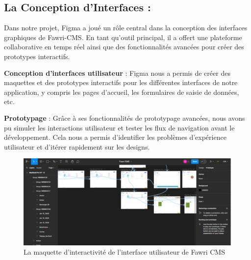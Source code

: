 \subsection{La Conception d'Interfaces :}

\hspace{\parindent}Dans notre projet, Figma a joué un rôle central dans la conception des interfaces graphiques de Fawri-CMS. En tant qu'outil principal, il a offert une plateforme collaborative en temps réel ainsi que des fonctionnalités avancées pour créer des prototypes interactifs.

\textbf{Conception d'interfaces utilisateur} : Figma nous a permis de créer des maquettes et des prototypes interactifs pour les différentes interfaces de notre application, y compris les pages d'accueil, les formulaires de saisie de données, etc.

\textbf{Prototypage} : Grâce à ses fonctionnalités de prototypage avancées, nous avons pu simuler les interactions utilisateur et tester les flux de navigation avant le développement. Cela nous a permis d'identifier les problèmes d'expérience utilisateur et d'itérer rapidement sur les designs.
\\
\begin{figure}[H]
  \centering
  \includegraphics[width=17cm]{Figures/figma.PNG}
  \caption{La maquette d'interactivité de l'interface utilisateur de Fawri CMS}
\end{figure}

















